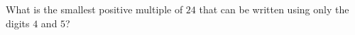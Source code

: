 What is the smallest positive multiple of $24$ that can be written using only the digits $4$ and $5$?
